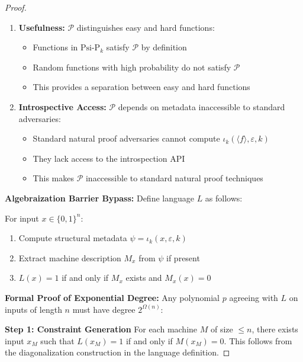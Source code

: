 \documentclass[11pt]{article}
\begin{document}
\begin{proof}
\begin{enumerate}
\begin{proof}[Existence and Computability of Compressed Representation]
\textbf{Correctness:}
The compressed representation preserves all structural information needed for introspection, as it contains the minimal description of the function's k-depth patterns. ∎
\end{proof}
\item \textbf{Usefulness:} $\mathcal{P}$ distinguishes easy and hard functions:
   \begin{itemize}
   \item Functions in $\text{Psi-P}_k$ satisfy $\mathcal{P}$ by definition
   \item Random functions with high probability do not satisfy $\mathcal{P}$
   \item This provides a separation between easy and hard functions
   \end{itemize}
\item \textbf{Introspective Access:} $\mathcal{P}$ depends on metadata inaccessible to standard adversaries:
   \begin{itemize}
   \item Standard natural proof adversaries cannot compute $\iota_k(\langle f \rangle, \varepsilon, k)$
   \item They lack access to the introspection API
   \item This makes $\mathcal{P}$ inaccessible to standard natural proof techniques
   \end{itemize}
\end{enumerate}

\textbf{Algebraization Barrier Bypass:}
Define language $L$ as follows:

For input $x \in \{0,1\}^n$:
\begin{enumerate}
\item Compute structural metadata $\psi = \iota_k(x, \varepsilon, k)$
\item Extract machine description $M_x$ from $\psi$ if present
\item $L(x) = 1$ if and only if $M_x$ exists and $M_x(x) = 0$
\end{enumerate}

\textbf{Formal Proof of Exponential Degree:}
Any polynomial $p$ agreeing with $L$ on inputs of length $n$ must have degree $2^{\Omega(n)}$:

\textbf{Step 1: Constraint Generation}
For each machine $M$ of size $\leq n$, there exists input $x_M$ such that $L(x_M) = 1$ if and only if $M(x_M) = 0$. This follows from the diagonalization construction in the language definition.


\end{proof}
\end{document}
